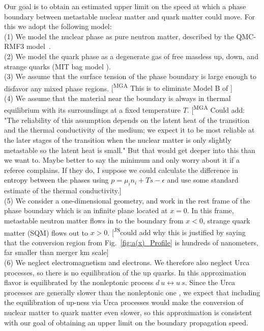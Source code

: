 \documentclass[10pt,superscriptaddress,
amsmath,aps,prl,twocolumn,nofootinbib]{revtex4-1}
\newcommand{\mga}[1]{{\color[rgb]{0.8,0,0}#1}}
\newcommand{\mgacom}[1]{\textsf{\color[rgb]{0.6,0,0}[\textsuperscript{MGA} #1]}}
\newcommand{\JScom}[1]{\textsf{\color{violet} [\textsuperscript{JS}#1]}}
\newcommand{\eps}{\epsilon}
\begin{document}
Our goal is to obtain an estimated upper limit on the speed at which a phase boundary between metastable nuclear matter and quark matter could move. For this we adopt the following model: \\
(1) We model the nuclear phase as pure neutron matter, 
described by the QMC-RMF3 model~\cite{Alford:2022bpp, Alford:2023rgp,qmc_rmf3}. \\
(2) We model the quark phase as a degenerate gas of free massless up, down, and strange quarks (MIT bag model \cite{Chodos:1974je,Farhi:1984qu}).\\
(3) \mga{We assume that the surface tension of the phase boundary is large enough to disfavor any mixed phase regions}. \mgacom{This is to eliminate Model B of \cite{Furusawa:2015vfn}}\\
(4) \mga{We assume that the material near the boundary is always in thermal equilibrium with its surroundings at a fixed temperature $T$.}
\mgacom{Could add: "The reliability of this assumption depends on the latent heat of the transition and the thermal conductivity of the medium; we expect it to be most reliable
at the later stages of the transition when the nuclear matter is only slightly metastable so the latent heat is small."
But that would get deeper into this than we want to. Maybe better to say the minimum and only worry about it if a referee complains. If they do, I suppose we could calculate the difference in entropy between the phases using $p=\mu_i n_i + Ts - \eps$ and use some standard estimate of the thermal conductivity.}\\
(5) We consider a one-dimensional geometry, and work in the rest frame of the phase boundary which is an infinite plane located at $x=0$. In this frame, metastable neutron matter flows in to the boundary from $x<0$, strange quark matter (SQM) flows out to $x>0$. \JScom{could add why this is justified by saying that the conversion region from Fig.~\ref{fig:a(x)_Profile} is hundreds of nanometers, far smaller than merger km scale}\\
(6) We neglect electromagnetism and electrons.
We therefore also neglect Urca processes, so there is no equilibration of the up quarks. In this approximation flavor is equilibrated by the nonleptonic process $d\ u \leftrightarrow u\ s$. Since the Urca processes are generally slower than the nonleptonic one \cite{Alford:2006gy,Alford:2025tbp,Sad:2007afd}, we expect that including the equilibration of up-ness via Urca processes would make the conversion of nuclear matter to quark matter even slower, so this approximation
is consistent with our goal of obtaining an upper limit on the boundary propagation speed.
\end{document}
